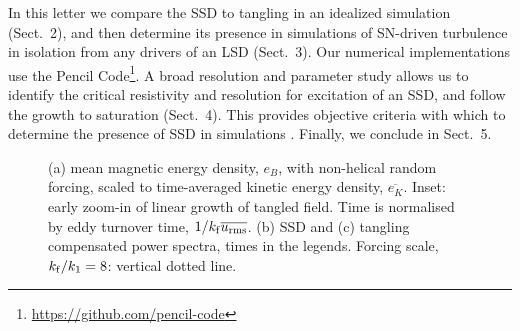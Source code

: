 \documentclass[preprint2]{aastex63}
\newcommand\kf{k_{\rm f} }
\begin{document}
In this letter we compare the SSD to tangling in an idealized simulation
(Sect.\ 2), and then determine its presence in simulations of SN-driven 
turbulence in isolation from any drivers of an LSD (Sect.\ 3). 
Our numerical implementations use the {\sc Pencil Code}\footnote{
\href{https://github.com/pencil-code}{https://github.com/pencil-code}}.
A broad resolution and parameter study allows us to identify the critical
resistivity and resolution for excitation of an SSD, and follow the growth to
saturation (Sect.\ 4).
This provides objective criteria with which to determine the presence of SSD
in simulations \citep[such as][]{Gent:2013b,GE20,SBADMN19}.
Finally, we conclude in Sect.\ 5.
\begin{figure*}
\caption{
 (a) mean magnetic energy density, $e_B$, with non-helical random forcing,
 scaled to time-averaged kinetic energy density, $\overline{e_K}$.
 Inset: early zoom-in of linear growth of tangled field.
 Time is normalised by eddy turnover time, $1/\kf \overline{u_{\rm rms}}$.
 (b) SSD and (c) tangling compensated power spectra, times in the legends.
  Forcing scale, $\kf/k_1=8$: vertical dotted line.
\label{fig:tangling}}
\end{figure*}
\end{document}

